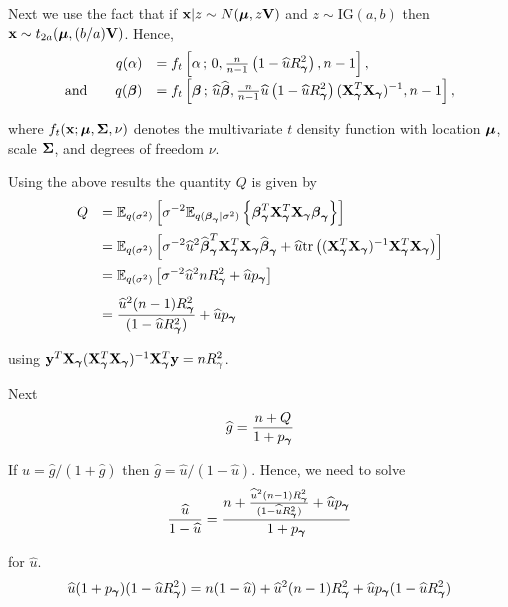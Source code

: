 \noindent
Next we use the fact that if ${\bf x}|z \sim N({\boldsymbol \mu},z{\bf V})$ and $z\sim \mbox{IG}(a,b)$ then
${\bf x} \sim t_{2a}( {\boldsymbol \mu}, (b/a){\bf V})$. 
Hence,
$$
\begin{array}{rl} 
q(\alpha) 
& \displaystyle = f_t\left[ \alpha \,;\, 0, \tfrac{n}{n-1}  \left( 1 - \widehat{u} R_{\boldsymbol \gamma}^2\right), n - 1\right],
\\ [1ex]
\displaystyle \mbox{and} \qquad q({\boldsymbol \beta}) 
& \displaystyle = f_t\left[ {\boldsymbol \beta} \,;\,
\widehat{u} \widehat{{\boldsymbol \beta}},
\tfrac{n}{n-1}  \widehat{u} \left( 1 - \widehat{u} R_{\boldsymbol \gamma}^2\right) ({\bf X}_{\boldsymbol \gamma}^T{\bf X}_{\boldsymbol \gamma})^{-1}, n - 1
\right],
\end{array}
$$

\noindent where $f_t( {\bf x}; {\boldsymbol \mu}, {\boldsymbol \Sigma}, \nu)$ denotes the multivariate
$t$ density function with location ${\boldsymbol \mu}$, scale ${\boldsymbol \Sigma}$, and degrees of 
freedom $\nu$.

Using the above results the quantity $Q$ is given by
$$
\begin{array}{rl} 
\displaystyle Q
& \displaystyle = \displaystyle {\mathbb E}_{q(\sigma^2)}\left[ \sigma^{-2}
{\mathbb E}_{q({\boldsymbol \beta}_{\boldsymbol \gamma}|\sigma^2)}
\left\{ 
{\boldsymbol \beta}_{\boldsymbol \gamma}^T{\bf X}_{\boldsymbol \gamma}^T{\bf X}_{\boldsymbol \gamma}{\boldsymbol \beta}_{\boldsymbol \gamma}
\right\}
\right]
\\ [2ex]
& \displaystyle = \displaystyle {\mathbb E}_{q(\sigma^2)}\left[
\sigma^{-2} \widehat{u}^2 \widehat{{\boldsymbol \beta}}_{\boldsymbol \gamma}^T{\bf X}_{\boldsymbol \gamma}^T{\bf X}_{\boldsymbol \gamma}\widehat{{\boldsymbol \beta}}_{\boldsymbol \gamma}
+   \widehat{u}  \mbox{tr}\left(  ({\bf X}_{\boldsymbol \gamma}^T{\bf X}_{\boldsymbol \gamma})^{-1}  {\bf X}_{\boldsymbol \gamma}^T{\bf X}_{\boldsymbol \gamma} \right)
\right]
\\ [2ex]
& \displaystyle = \displaystyle {\mathbb E}_{q(\sigma^2)}\left[ 
\sigma^{-2}\widehat{u}^2 n R_{\boldsymbol \gamma}^2
+  \widehat{u} p_{\boldsymbol \gamma}
\right]
\\ [2ex]
& \displaystyle = \displaystyle 
\frac{\widehat{u}^2 (n-1) R_{\boldsymbol \gamma}^2}{( 1 - \widehat{u} R_{\boldsymbol \gamma}^2)}
+  \widehat{u} p_{\boldsymbol \gamma}
\end{array}
$$

\noindent using ${\bf y}^T{\bf X}_{\boldsymbol \gamma}({\bf X}_{\boldsymbol \gamma}^T{\bf X}_{\boldsymbol \gamma})^{-1}{\bf X}_{\boldsymbol \gamma}^T{\bf y}  = n R_\gamma^2$.

Next
$$
\widehat{g} = \frac{n + Q}{1 + p_{\boldsymbol \gamma}}
$$

\noindent If $\widehat{u} = \widehat{g}/(1+\widehat{g})$ then
$\widehat{g} =  \widehat{u}/(1 - \widehat{u})$. Hence, we need to solve
$$
\frac{\widehat{u}}{1 - \widehat{u}} = \frac{n + \frac{\widehat{u}^2 (n-1) R_{\boldsymbol \gamma}^2}{( 1 - \widehat{u} R_{\boldsymbol \gamma}^2)}
	+  \widehat{u} p_{\boldsymbol \gamma}}{1 + p_{\boldsymbol \gamma}}
$$

\noindent for $\widehat{u}$.  
$$
\widehat{u}(1 + p_{\boldsymbol \gamma})(1 - \widehat{u} R_{\boldsymbol \gamma}^2)
= n(1 - \widehat{u}) 
+ \widehat{u}^2 (n-1) R_{\boldsymbol \gamma}^2 
+  \widehat{u} p_{\boldsymbol \gamma} ( 1 - \widehat{u} R_{\boldsymbol \gamma}^2)
$$


